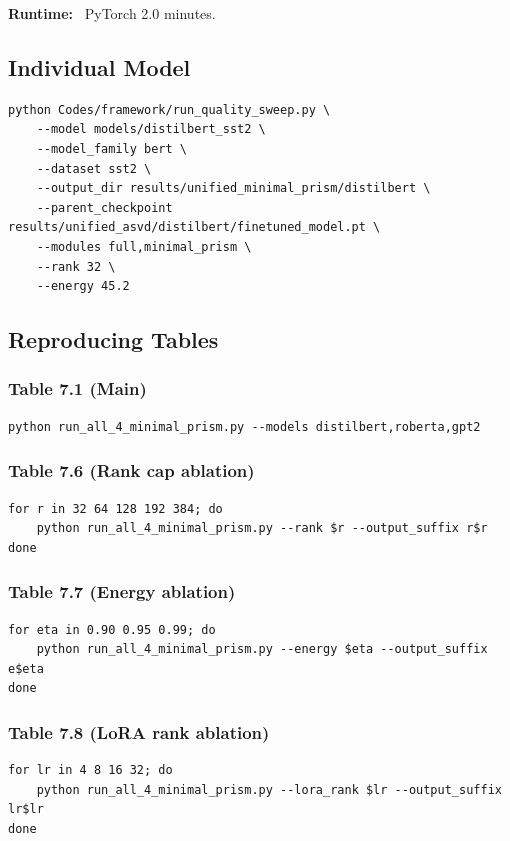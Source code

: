\textbf{Runtime:} ~PyTorch 2.0 minutes.

\subsection{Individual Model}

\begin{lstlisting}
python Codes/framework/run_quality_sweep.py \
    --model models/distilbert_sst2 \
    --model_family bert \
    --dataset sst2 \
    --output_dir results/unified_minimal_prism/distilbert \
    --parent_checkpoint results/unified_asvd/distilbert/finetuned_model.pt \
    --modules full,minimal_prism \
    --rank 32 \
    --energy 45.2
\end{lstlisting}

\subsection{Reproducing Tables}

\subsubsection{Table 7.1 (Main)}
\begin{lstlisting}
python run_all_4_minimal_prism.py --models distilbert,roberta,gpt2
\end{lstlisting}

\subsubsection{Table 7.6 (Rank cap ablation)}
\begin{lstlisting}
for r in 32 64 128 192 384; do
    python run_all_4_minimal_prism.py --rank $r --output_suffix r$r
done
\end{lstlisting}

\subsubsection{Table 7.7 (Energy ablation)}
\begin{lstlisting}
for eta in 0.90 0.95 0.99; do
    python run_all_4_minimal_prism.py --energy $eta --output_suffix e$eta
done
\end{lstlisting}

\subsubsection{Table 7.8 (LoRA rank ablation)}
\begin{lstlisting}
for lr in 4 8 16 32; do
    python run_all_4_minimal_prism.py --lora_rank $lr --output_suffix lr$lr
done
\end{lstlisting}

